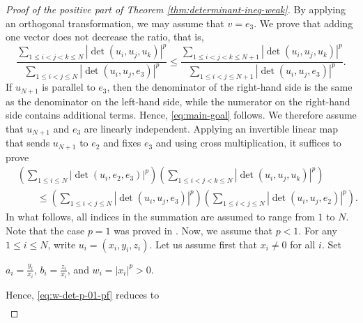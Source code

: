 \documentclass[11pt,a4paper]{amsart}
\theoremstyle{plain}
\theoremstyle{definition}
\begin{document}
\begin{proof}[Proof of the positive part of Theorem \ref{thm:determinant-ineq-weak}]
    By applying an orthogonal transformation, we may assume that $v = e_3$. 
    We prove that adding one vector does not decrease the ratio, that is,
    \begin{equation} \label{eq:main-goal}
        \frac{\displaystyle\sum_{1 \leq i< j < k \leq N}\left|\operatorname{det}\left(u_i,u_j,u_k\right)\right|^p}{\displaystyle\sum_{1 \leq i< j  \leq N}\left|\operatorname{det}\left(u_i,u_j,e_3\right)\right|^p} 
        \leq 
        \frac{\displaystyle\sum_{1 \leq i< j < k \leq N+1}\left|\operatorname{det}\left(u_i,u_j,u_k\right)\right|^p}{\displaystyle\sum_{1 \leq i< j  \leq N+1}\left|\operatorname{det}\left(u_i,u_j,e_3\right)\right|^p}.
    \end{equation}
    If $u_{N+1} $ is parallel to $e_3$, then the denominator of the right-hand side is the same as the denominator on the left-hand side, while the numerator on the right-hand side contains additional terms. Hence, \eqref{eq:main-goal} follows. We therefore assume that $u_{N+1}$ and $e_3$ are linearly independent. Applying an invertible linear map that sends  $u_{N+1}$ to $e_2$ and fixes $e_3 $ and using cross multiplication, it suffices to prove 
    \begin{align}
        \label{eq:w-det-p-01-pf}
         &\left(\sum_{1\leq i \leq N}\left|\operatorname{det}\left(u_i, e_2, e_3\right)\right|^p\right)\left(\sum_{1\leq i<j<k\leq N}\left|\operatorname{det}\left(u_i, u_j, u_k\right)\right|^p\right)
         \\
         &\qquad \leq
         \left(\sum_{1\leq i<j\leq N}\left|\operatorname{det}\left(u_i, u_j, e_3\right)\right|^p\right)\left(\sum_{1\leq i<j \leq N}\left|\operatorname{det}\left(u_i, u_j, e_2\right)\right|^p\right) .
    \end{align}
    In what follows, all indices in the summation are assumed to range from $1$ to $N$.
    Note that the case $p =1$ was proved in \cite[Theorem 5.1]{FMMZ-24}. Now, we assume that $p <1$.
    For any $1\leq i \leq N$, write $ u_i = (x_i,y_i,z_i)$. Let us assume first that $x_i \neq 0$ for all $i$. Set
    \begin{center}
        $a_i = \frac{y_i}{x_i}$, \quad  $b_i = \frac{z_i}{x_i}$,
        \quad and \quad $w_i = |x_i|^p > 0$.
    \end{center}
    Hence, \eqref{eq:w-det-p-01-pf} reduces to 
    \begin{equation}
    \begin{split}

\end{split}
\end{equation}
\end{proof}
\end{document}
